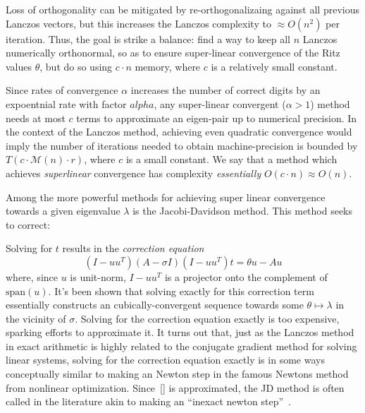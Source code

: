 \documentclass[10pt]{article}
\numberwithin{equation}{section}
\newcommand{\+}{%
	\raisebox{0.18ex}{\scaleobj{0.55}{+}}
}
\theoremstyle{definition}
\begin{document}
Loss of orthogonality can be mitigated by re-orthogonalizaing against all previous Lanczos vectors, but this increases the Lanczos complexity to $\approx O(n^2)$ per iteration. 
Thus, the goal is strike a balance: find a way to keep all $n$ Lanczos numerically orthonormal, so as to ensure super-linear convergence of the Ritz values $\theta$, but do so using $c \cdot n$ memory, where $c$ is a relatively small constant.

Since rates of convergence $\alpha$ increases the number of correct digits by an expoentnial rate with factor $alpha$, any super-linear convergent ($\alpha > 1$) method needs at most $c$ terms to approximate an eigen-pair up to numerical precision. 
In the context of the Lanczos method, achieving even quadratic convergence would imply the number of iterations needed to obtain machine-precision is bounded by $T(c \cdot \mathcal{M}(n) \cdot r)$, where $c$ is a small constant. We say that a method which achieves \emph{superlinear} convergence has complexity \emph{essentially} $O(c\cdot n) \approx O(n)$.


Among the more powerful methods for achieving super linear convergence towards a given eigenvalue $\lambda$ is the Jacobi-Davidson method. This method seeks to correct:

Solving for $t$ results in the \emph{correction equation}
\begin{equation}
	(I - u u^T)(A - \sigma I )(I - u u^T) t = \theta u - A u 
\end{equation}
where, since $u$ is unit-norm, $I - u u^T$ is a projector onto the complement of $\mathrm{span}(u)$. 
It's been shown that solving exactly for this correction term essentially constructs an cubically-convergent sequence towards some $\theta \mapsto \lambda$ in the vicinity of $\sigma$. Solving for the correction equation exactly is too expensive, sparking efforts to approximate it. It turns out that, just as the Lanczos method in exact arithmetic is highly related to the conjugate gradient method for solving linear systems, solving for the correction equation exactly is in some ways conceptually similar to making an Newton step in the famous Newtons method from nonlinear optimization. Since~\eqref{} is approximated, the JD method is often called in the literature akin to making an ``inexact newton step''~\cite{}.
\end{document}
